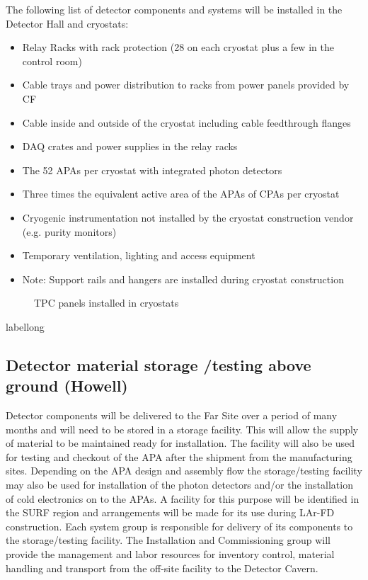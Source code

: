The following list of detector components and systems will be installed in the Detector Hall and cryostats: 

\begin{itemize}
\item Relay Racks with rack protection (28 on each cryostat plus a few in the control room) 
\item Cable trays and power distribution to racks from power panels provided by CF 
\item Cable inside and outside of the cryostat including cable feedthrough flanges 
\item DAQ crates and power supplies in the relay racks 
\item The 52 APAs per cryostat with integrated photon detectors 
\item Three times the equivalent active area of the APAs of CPAs per cryostat 
\item Cryogenic instrumentation not installed by the cryostat construction vendor (e.g. purity monitors) 
\item Temporary ventilation, lighting and access equipment 
\item Note: Support rails and hangers are installed during cryostat construction 
\end{itemize}

\begin{figure}[htbp]
\centering
\caption{TPC panels installed in cryostats } 
\label{fig:tpc-panels-in-cryostat}
\end{figure}
\begin{cdrfigure}[short]{label}{long}
\end{cdrfigure}

\subsection{Detector material storage /testing above ground (Howell)}
\label{fd:install:fsinstall:mat:storage}

Detector components will be delivered to the Far Site over a period of many months and will need to be stored in a storage facility. This will allow the supply of material to be maintained ready for installation. The facility will 
also be used for testing and checkout of the APA after the shipment from the manufacturing sites. Depending on the APA design and assembly flow the storage/testing facility may also be used for installation of the photon 
detectors and/or the installation of cold electronics on to the APAs.  A facility for this purpose will be identified in the SURF region and arrangements will be made for its use during LAr-FD construction. Each system group is 
responsible for delivery of its components to the storage/testing facility. The Installation and Commissioning group will provide the management and labor resources for inventory control, material handling and transport from the off-site facility to the Detector Cavern. 

